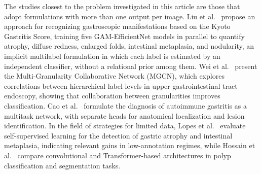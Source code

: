 \documentclass[12pt]{article}
\begin{document}

The studies closest to the problem investigated in this article are those that adopt formulations with more than one output per image. Liu et al.~\cite{Liu2024} propose an approach for recognizing gastroscopic manifestations based on the Kyoto Gastritis Score, training five GAM-EfficientNet models in parallel to quantify atrophy, diffuse redness, enlarged folds, intestinal metaplasia, and nodularity, an implicit multilabel formulation in which each label is estimated by an independent classifier, without a relational prior among them. Wei et al.~\cite{Wei2025} present the Multi-Granularity Collaborative Network (MGCN), which explores correlations between hierarchical label levels in upper gastrointestinal tract endoscopy, showing that collaboration between granularities improves classification. Cao et al.~\cite{Cao2025} formulate the diagnosis of autoimmune gastritis as a multitask network, with separate heads for anatomical localization and lesion identification. In the field of strategies for limited data, Lopes et al.~\cite{10782717} evaluate self-supervised learning for the detection of gastric atrophy and intestinal metaplasia, indicating relevant gains in low-annotation regimes, while Hossain et al.~\cite{10235970} compare convolutional and Transformer-based architectures in polyp classification and segmentation tasks.
\end{document}
